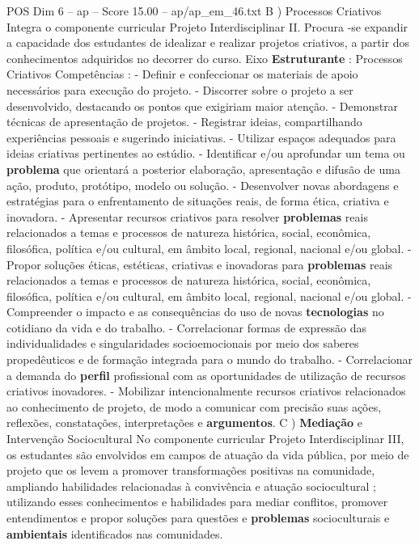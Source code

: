 \begin{textsample}{POS Dim 6 – ap – Score 15.00 – ap/ap\_em\_46.txt}
B ) Processos Criativos Integra o componente curricular Projeto Interdisciplinar II.
Procura -se expandir a capacidade dos estudantes de idealizar e realizar projetos criativos, a partir dos conhecimentos adquiridos no decorrer do curso.
Eixo \textbf{Estruturante} : Processos Criativos Competências : - Definir e confeccionar os materiais de apoio necessários para execução do projeto. - Discorrer sobre o projeto a ser desenvolvido, destacando os pontos que exigiriam maior atenção. - Demonstrar técnicas de apresentação de projetos. - Registrar ideias, compartilhando experiências pessoais e sugerindo iniciativas. - Utilizar espaços adequados para ideias criativas pertinentes ao estúdio. - Identificar e/ou aprofundar um tema ou \textbf{problema} que orientará a posterior elaboração, apresentação e difusão de uma ação, produto, protótipo, modelo ou solução. - Desenvolver novas abordagens e estratégias para o enfrentamento de situações reais, de forma ética, criativa e inovadora. - Apresentar recursos criativos para resolver \textbf{problemas} reais relacionados a temas e processos de natureza histórica, social, econômica, filosófica, política e/ou cultural, em âmbito local, regional, nacional e/ou global. - Propor soluções éticas, estéticas, criativas e inovadoras para \textbf{problemas} reais relacionados a temas e processos de natureza histórica, social, econômica, filosófica, política e/ou cultural, em âmbito local, regional, nacional e/ou global. - Compreender o impacto e as consequências do uso de novas \textbf{tecnologias} no cotidiano da vida e do trabalho. - Correlacionar formas de expressão das individualidades e singularidades socioemocionais por meio dos saberes propedêuticos e de formação integrada para o mundo do trabalho. - Correlacionar a demanda do \textbf{perfil} profissional com as oportunidades de utilização de recursos criativos inovadores. - Mobilizar intencionalmente recursos criativos relacionados ao conhecimento de projeto, de modo a comunicar com precisão suas ações, reflexões, constatações, interpretações e \textbf{argumentos}.
C ) \textbf{Mediação} e Intervenção Sociocultural No componente curricular Projeto Interdisciplinar III, os estudantes são envolvidos em campos de atuação da vida pública, por meio de projeto que os levem a promover transformações positivas na comunidade, ampliando habilidades relacionadas à convivência e atuação sociocultural ; utilizando esses conhecimentos e habilidades para mediar conflitos, promover entendimentos e propor soluções para questões e \textbf{problemas} socioculturais e \textbf{ambientais} identificados nas comunidades.

\end{textsample}
